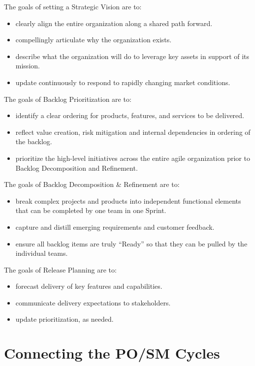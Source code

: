 \documentclass[12pt,a4paper,parskip=full]{scrartcl}
\begin{document}
The goals of setting a Strategic Vision are to:
\begin{itemize}
\item clearly align the entire organization along a shared path forward.
\item compellingly articulate why the organization exists.
\item describe what the organization will do to leverage key assets in
support of its mission.
\item update continuously to respond to rapidly changing market conditions.
\end{itemize}
The goals of Backlog Prioritization are to:
\begin{itemize}
\item identify a clear ordering for products, features, and services to be
delivered.
\item reflect value creation, risk mitigation and internal dependencies in
ordering of the backlog.
\item prioritize the high-level initiatives across the entire agile
organization prior to Backlog Decomposition and Refinement.
\end{itemize}
The goals of Backlog Decomposition \& Refinement are to:
\begin{itemize}
\item break complex projects and products into independent functional
elements that can be completed by one team in one Sprint.
\item capture and distill emerging requirements and customer feedback.
\item ensure all backlog items are truly ``Ready'' so that they can be
pulled by the individual teams.
\end{itemize}
The goals of Release Planning are to:
\begin{itemize}
\item forecast delivery of key features and capabilities.
\item communicate delivery expectations to stakeholders.
\item update prioritization, as needed.
\end{itemize}

\section{Connecting the PO/SM Cycles}
\end{document}
